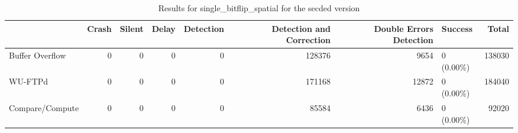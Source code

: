 \begin{table}[t]
	\centering
	\caption{Results for single_bitflip_spatial for the secded version}
	\label{table:end_sim_by_status_secded_3_single_bitflip_spatial}
	\begin{tabular}{lrrrrrrlr}
		\toprule
		                & Crash & Silent & Delay & Detection & Detection and Correction & Double Errors Detection & Success    & Total  \\
		\midrule
		Buffer Overflow & 0     & 0      & 0     & 0         & 128376                   & 9654                    & 0 (0.00\%) & 138030 \\
		WU-FTPd         & 0     & 0      & 0     & 0         & 171168                   & 12872                   & 0 (0.00\%) & 184040 \\
		Compare/Compute & 0     & 0      & 0     & 0         & 85584                    & 6436                    & 0 (0.00\%) & 92020  \\
		\bottomrule
	\end{tabular}
\end{table}
